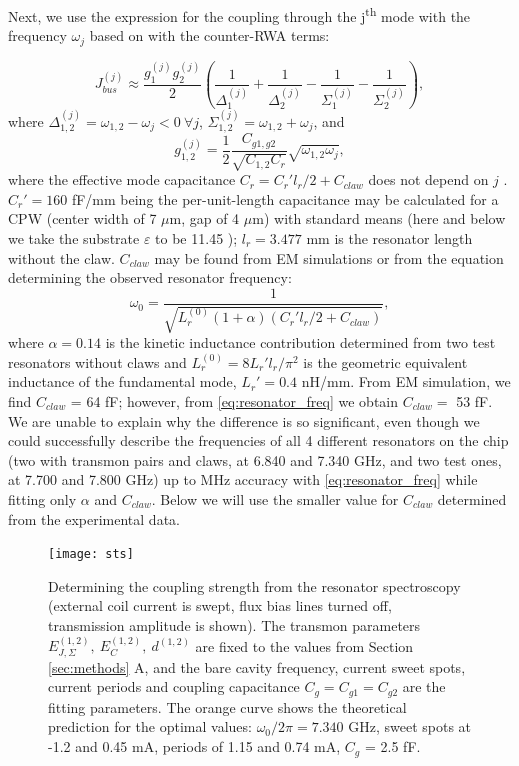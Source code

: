 \documentclass[%
 aps, prx,
 amsmath,amssymb,
 reprint,%
superscriptaddress
]{revtex4-2}
\begin{document}
Next, we use the expression for the coupling through the j\textsuperscript{th} mode with the frequency $\omega_j$ based on \cite{yan2018tunable} with the counter-RWA terms:

\begin{equation}
\label{eq:bus_coupling}
J^{(j)}_{bus} \approx \frac{g_1^{(j)}g_2^{(j)}}{2}\left(\frac{1}{\Delta_{1}^{(j)}}+\frac{1}{\Delta_{2}^{(j)}}-\frac{1}{\Sigma_{1}^{(j)}}-\frac{1}{\Sigma_2^{(j)}}\right),
\end{equation}
where $\Delta_{1, 2}^{(j)}=\omega_{1,2}-\omega_j < 0\ \forall j$, $\Sigma_{1,2}^{(j)}=\omega_{1,2}+\omega_j$, and
\begin{equation}
\label{eq:g}
	g_{1,2}^{(j)} =\frac{1}{2}\frac{C_{g1, g2}}{\sqrt{C_{1,2}C_r}}\sqrt{\omega_{1,2}\omega_j},
\end{equation}
where the effective mode capacitance $C_r = C_r' l_r/2 + C_{claw}$ does not depend on $j$ \cite{yan2018tunable, pozar2009microwave}. $C_r' = 160$ fF/mm being the per-unit-length capacitance may be calculated for a CPW (center width of 7 $\mu$m, gap of 4 $\mu$m) with standard means (here and below we take the substrate $\varepsilon$ to be 11.45 \cite{krupka2006measurements}); $l_r = 3.477$ mm is the resonator length without the claw. $C_{claw}$ may be found from EM simulations or from the equation determining the observed resonator frequency:
\begin{equation}
	\label{eq:resonator_freq}
	\omega_0 = \frac{1}{\sqrt{L_r^{(0)}(1+\alpha) (C_r' l_r/2 + C_{claw})}},
\end{equation}
where $\alpha = 0.14$ is the kinetic inductance contribution determined from two test resonators without claws and $L_r^{(0)} = 8 L_r' l_r/\pi^2$ is the geometric equivalent inductance of the fundamental mode, $L_r' = 0.4$ nH/mm.
From EM simulation, we find $C_{claw}$ = 64 fF; however, from \autoref{eq:resonator_freq} we obtain $C_{claw} = $ 53 fF. We are unable to explain why the difference is so significant, even though we could successfully describe the frequencies of all 4 different resonators on the chip (two with transmon pairs and claws, at 6.840 and 7.340 GHz, and two test ones, at 7.700 and 7.800 GHz) up to MHz accuracy with \autoref{eq:resonator_freq} while fitting only $\alpha$ and $C_{claw}$. Below we will use the smaller value for $C_{claw}$ determined from the experimental data.


\begin{figure}[b]
	\texttt{[image: sts]}
	\caption{Determining the coupling strength from the resonator spectroscopy (external coil current is swept, flux bias lines turned off, transmission amplitude is shown). The transmon parameters $E_{J,\Sigma}^{(1,2)},\ E_C^{(1,2)},\ d^{(1,2)}$ are fixed to the values from Section \ref{sec:methods} A, and the bare cavity frequency, current sweet spots, current periods and coupling capacitance $C_g = C_{g1} = C_{g2}$ are the fitting parameters. The orange curve shows the theoretical prediction for the optimal values: $\omega_0/2\pi = 7.340$ GHz, sweet spots at -1.2 and 0.45 mA, periods of 1.15 and 0.74 mA, $C_g$ = 2.5 fF.}
	\label{fig:sts}
\end{figure}
\end{document}

